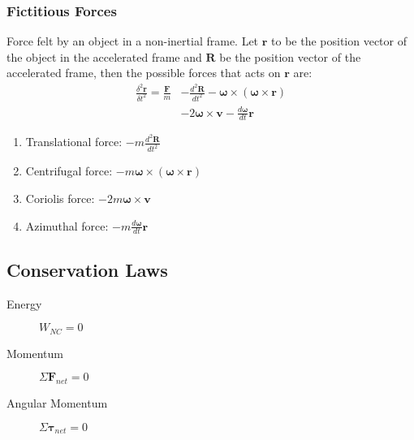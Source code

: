 \documentclass[11pt]{article}
\newcommand{\ve}[1]{\ensuremath{\boldsymbol{#1}}}
\begin{document}
\begin{multicols*}{3}
\subsubsection*{Fictitious Forces}
Force felt by an object in a non-inertial frame. Let $\ve{r}$ to be the position vector of the object in the accelerated frame and $\ve{R}$ be the position vector of the accelerated frame, then the possible forces that acts on $\ve{r}$ are:
	\begin{align*}
	\frac{\delta^2\ve{r}}{\delta t ^2} = \frac{\ve{F}}{m}
	&- \frac{d^2\ve{R}}{dt^2}
	- \ve{\omega} \times (\ve{\omega}\times\ve{r})\\
	&- 2\ve{\omega} \times \ve{v}
	- \frac{d\ve{\omega}}{dt} \ve{r}
	\end{align*}
\begin{enumerate}
\item Translational force: $- m\frac{d^2\ve{R}}{dt^2}$
\item Centrifugal force: $-m\ve{\omega} \times (\ve{\omega}\times\ve{r})$
\item Coriolis force: $-2m\ve{\omega} \times \ve{v}$
\item Azimuthal force: $-m \frac{d\ve{\omega}}{dt} \ve{r}$
\end{enumerate}
\subsection{Conservation Laws}
\begin{description}
\item[Energy] $W_{NC} = 0$
\item[Momentum] $\Sigma \ve{F}_{net} = 0$ 
\item[Angular Momentum] $\Sigma \ve{\tau}_{net} = 0$ 
\end{description}

\end{multicols*}
\end{document}
